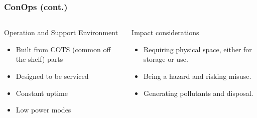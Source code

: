 \documentclass[aspectratio=169]{beamer}
\begin{document}
\begin{frame}
    \frametitle{ConOps (cont.)}

    \begin{columns}
        \begin{column}{0.48\textwidth}
            \begin{block}{Operation and Support Environment}
                \begin{itemize}
                 \item Built from COTS (common off the shelf) parts
                 \item Designed to be serviced
                 \item Constant uptime
                 \item Low power modes
                \end{itemize}
            \end{block}
        \end{column}

        \begin{column}{0.48\textwidth}
            \begin{block}{Impact considerations}
                \begin{itemize}
                 \item Requiring physical space, either for storage or use.
                 \item Being a hazard and risking misuse.
                 \item Generating pollutants and disposal.
                \end{itemize}
            \end{block}
        \end{column}
    \end{columns}


\end{frame}
\end{document}
